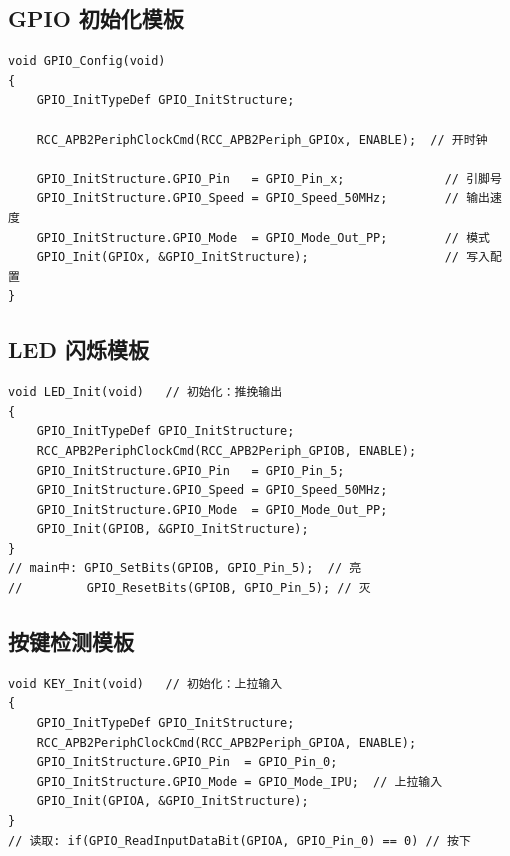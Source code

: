 \documentclass[10pt,a4paper,oneside]{ctexart}
\begin{document}
\subsection*{GPIO 初始化模板}

\begin{codebox}
\begin{lstlisting}[style=stm32, numbers=none]
void GPIO_Config(void)
{
    GPIO_InitTypeDef GPIO_InitStructure;

    RCC_APB2PeriphClockCmd(RCC_APB2Periph_GPIOx, ENABLE);  // 开时钟

    GPIO_InitStructure.GPIO_Pin   = GPIO_Pin_x;              // 引脚号
    GPIO_InitStructure.GPIO_Speed = GPIO_Speed_50MHz;        // 输出速度
    GPIO_InitStructure.GPIO_Mode  = GPIO_Mode_Out_PP;        // 模式
    GPIO_Init(GPIOx, &GPIO_InitStructure);                   // 写入配置
}
\end{lstlisting}
\end{codebox}

\subsection*{LED 闪烁模板}

\begin{codebox}
\begin{lstlisting}[style=stm32, numbers=none]
void LED_Init(void)   // 初始化：推挽输出
{
    GPIO_InitTypeDef GPIO_InitStructure;
    RCC_APB2PeriphClockCmd(RCC_APB2Periph_GPIOB, ENABLE);
    GPIO_InitStructure.GPIO_Pin   = GPIO_Pin_5;
    GPIO_InitStructure.GPIO_Speed = GPIO_Speed_50MHz;
    GPIO_InitStructure.GPIO_Mode  = GPIO_Mode_Out_PP;
    GPIO_Init(GPIOB, &GPIO_InitStructure);
}
// main中: GPIO_SetBits(GPIOB, GPIO_Pin_5);  // 亮
//         GPIO_ResetBits(GPIOB, GPIO_Pin_5); // 灭
\end{lstlisting}
\end{codebox}

\subsection*{按键检测模板}

\begin{codebox}
\begin{lstlisting}[style=stm32, numbers=none]
void KEY_Init(void)   // 初始化：上拉输入
{
    GPIO_InitTypeDef GPIO_InitStructure;
    RCC_APB2PeriphClockCmd(RCC_APB2Periph_GPIOA, ENABLE);
    GPIO_InitStructure.GPIO_Pin  = GPIO_Pin_0;
    GPIO_InitStructure.GPIO_Mode = GPIO_Mode_IPU;  // 上拉输入
    GPIO_Init(GPIOA, &GPIO_InitStructure);
}
// 读取: if(GPIO_ReadInputDataBit(GPIOA, GPIO_Pin_0) == 0) // 按下
\end{lstlisting}
\end{codebox}
\end{document}
